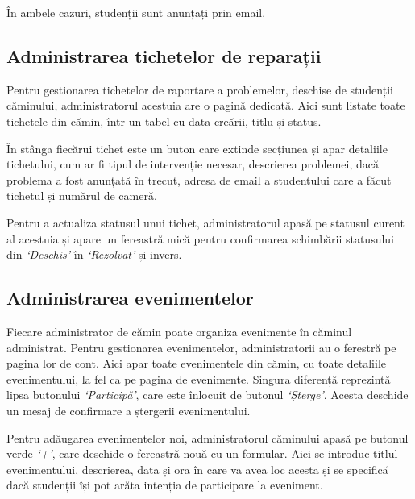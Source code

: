 \documentclass[12pt,a4paper]{report}
\theoremstyle{definition}
\theoremstyle{remark}
\begin{document}
\par În ambele cazuri, studenții sunt anunțați prin email.


\subsection{Administrarea tichetelor de reparații}

\par Pentru gestionarea tichetelor de raportare a  problemelor, deschise de studenții \textnormal{că\-mi\-nu\-lui}, administratorul acestuia are o pagină dedicată. Aici sunt listate toate tichetele din cămin, într-un tabel cu data creării, titlu și status.

\par În stânga fiecărui tichet este un buton care extinde secțiunea și apar detaliile tichetului, cum ar fi tipul de intervenție necesar, descrierea problemei, dacă problema a fost anunțată în trecut, adresa de email a studentului care a făcut tichetul și numărul de cameră.

\par Pentru a actualiza statusul unui tichet, administratorul apasă pe statusul curent al acestuia și apare un fereastră mică pentru confirmarea schimbării statusului din \textit{`Deschis'} în \textit{`Rezolvat'} și invers.


\subsection{Administrarea evenimentelor}

\par Fiecare administrator de cămin poate organiza evenimente în căminul administrat. Pentru gestionarea evenimentelor, administratorii au o ferestră pe pagina lor de cont. Aici apar toate evenimentele din cămin, cu toate detaliile evenimentului, la fel ca pe pagina de evenimente. Singura diferență reprezintă lipsa butonului \textit{`Participă'}, care este înlocuit de butonul \textit{`Șterge'}. Acesta deschide un mesaj de confirmare a ștergerii evenimentului.


\par Pentru adăugarea evenimentelor noi, administratorul căminului apasă pe butonul verde \textit{`+'}, care deschide o fereastră nouă cu un formular. Aici se introduc titlul evenimentului, descrierea, data și ora în care va avea loc acesta și se specifică dacă studenții își pot arăta intenția de participare la eveniment.
\end{document}

